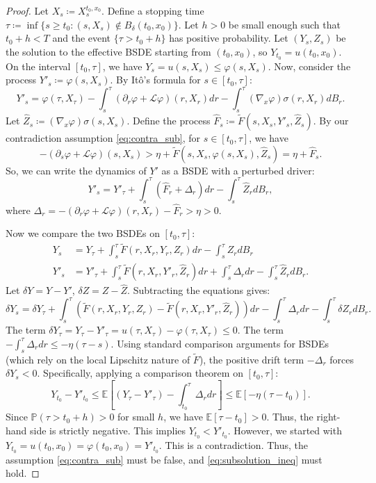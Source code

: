 \documentclass[12pt, letterpaper]{amsart}
\theoremstyle{plain}
\theoremstyle{definition}
\theoremstyle{remark}
\numberwithin{equation}{section} %
\begin{document}
\begin{proof}
Let $X_s \coloneqq X_s^{t_0,x_0}$. Define a stopping time $\tau \coloneqq \inf\{s \ge t_0 : (s,X_s) \notin B_\delta(t_0,x_0)\}$. Let $h>0$ be small enough such that $t_0+h < T$ and the event $\{\tau > t_0+h\}$ has positive probability.
Let $(Y_s, Z_s)$ be the solution to the effective BSDE starting from $(t_0, x_0)$, so $Y_{t_0} = u(t_0,x_0)$. On the interval $[t_0, \tau]$, we have $Y_s = u(s, X_s) \le \varphi(s, X_s)$.
Now, consider the process $Y'_s \coloneqq \varphi(s,X_s)$. By It\^o's formula for $s \in [t_0, \tau]$:
\[
    Y'_s = \varphi(\tau, X_\tau) - \int_s^\tau \left( \partial_r \varphi + \mathcal{L}\varphi \right)(r,X_r) dr - \int_s^\tau (\nabla_x \varphi)\sigma(r,X_r) dB_r.
\]
Let $\hat{Z}_s \coloneqq (\nabla_x \varphi)\sigma(s,X_s)$. Define the process $\hat{F}_s \coloneqq \tilde{F}(s,X_s,Y'_s,\hat{Z}_s)$.
By our contradiction assumption \eqref{eq:contra_sub}, for $s \in [t_0, \tau]$, we have
\[ -(\partial_s \varphi + \mathcal{L}\varphi)(s,X_s) > \eta + \tilde{F}(s,X_s,\varphi(s,X_s), \hat{Z}_s) = \eta + \hat{F}_s. \]
So, we can write the dynamics of $Y'$ as a BSDE with a perturbed driver:
\[ Y'_s = Y'_\tau + \int_s^\tau \left( \hat{F}_r + \Delta_r \right) dr - \int_s^\tau \hat{Z}_r dB_r, \]
where $\Delta_r = -(\partial_r \varphi + \mathcal{L}\varphi)(r,X_r) - \hat{F}_r > \eta > 0$.

Now we compare the two BSDEs on $[t_0, \tau]$:
\begin{align*}
    Y_s &= Y_\tau + \int_s^\tau \tilde{F}(r,X_r, Y_r, Z_r) dr - \int_s^\tau Z_r dB_r \\
    Y'_s &= Y'_\tau + \int_s^\tau \tilde{F}(r,X_r, Y'_r, \hat{Z}_r) dr + \int_s^\tau \Delta_r dr - \int_s^\tau \hat{Z}_r dB_r.
\end{align*}
Let $\delta Y = Y - Y'$, $\delta Z = Z - \hat{Z}$. Subtracting the equations gives:
\[
    \delta Y_s = \delta Y_\tau + \int_s^\tau \left( \tilde{F}(r,X_r, Y_r, Z_r) - \tilde{F}(r,X_r, Y'_r, \hat{Z}_r) \right) dr - \int_s^\tau \Delta_r dr - \int_s^\tau \delta Z_r dB_r.
\]
The term $\delta Y_\tau = Y_\tau - Y'_\tau = u(\tau, X_\tau) - \varphi(\tau, X_\tau) \le 0$. The term $-\int_s^\tau \Delta_r dr \le -\eta(\tau-s)$.
Using standard comparison arguments for BSDEs (which rely on the local Lipschitz nature of $\tilde{F}$), the positive drift term $-\Delta_r$ forces $\delta Y_s < 0$. Specifically, applying a comparison theorem on $[t_0, \tau]$:
\[ Y_{t_0} - Y'_{t_0} \le \mathbb{E}\left[ (Y_\tau - Y'_\tau) - \int_{t_0}^\tau \Delta_r dr \right] \le \mathbb{E}\left[ -\eta(\tau - t_0) \right]. \]
Since $\mathbb{P}(\tau > t_0+h) > 0$ for small $h$, we have $\mathbb{E}[\tau-t_0] > 0$. Thus, the right-hand side is strictly negative.
This implies $Y_{t_0} < Y'_{t_0}$. However, we started with $Y_{t_0} = u(t_0,x_0) = \varphi(t_0,x_0) = Y'_{t_0}$. This is a contradiction. Thus, the assumption \eqref{eq:contra_sub} must be false, and \eqref{eq:subsolution_ineq} must hold.


\end{proof}
\end{document}
